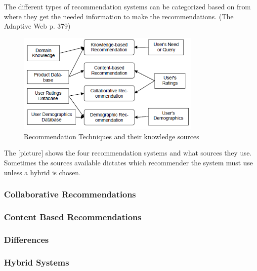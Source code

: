 The different types of recommendation systems can be categorized based on from where they get the needed information to make the recommendations. (The Adaptive Web p. 379)

\begin{figure}[htb]
\centering
\includegraphics[width=0.8\textwidth]{Images/RecTypes.png}
\caption{Recommendation Techniques and their knowledge sources}
\label{RecTypes}
\end{figure}

The [picture] shows the four recommendation systems and what sources they use. Sometimes the sources available dictates which recommender the system must use unless a hybrid is chosen. 


\subsubsection{Collaborative Recommendations} 
\label{Collaborative} 

\subsubsection{Content Based Recommendations} 
\label{ContentBased} 

\subsubsection{Differences}
\label{Differences} 

\subsubsection{Hybrid Systems} 
\label{Hybrid} 
